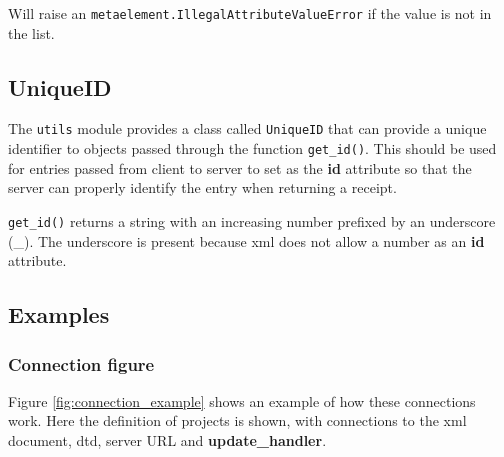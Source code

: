 Will raise an \texttt{metaelement.IllegalAttributeValueError} if the value is
not in the list.

\subsection{UniqueID}
The \texttt{utils} module provides a class called \texttt{UniqueID} that can
provide a unique identifier to objects passed through the function
\texttt{get\_id()}. This should be used for entries passed from client to
server to set as the \textbf{id} attribute so that the server can properly
identify the entry when returning a receipt. 

\texttt{get\_id()} returns a string with an increasing number prefixed by an
underscore (\_). The underscore is present because \gls{xml} does not allow a
number as an \textbf{id} attribute. 

\subsection{Examples}

\subsubsection{Connection figure}
Figure \ref{fig:connection_example} shows an example of how these connections
work. Here the definition of projects is shown, with connections to the
\gls{xml} document, \gls{dtd}, server URL and \textbf{update\_handler}.

